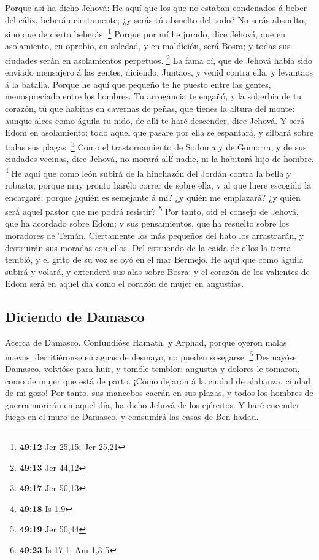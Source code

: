  Porque así ha dicho Jehová: He aquí que los que no
estaban condenados á beber del cáliz, beberán ciertamente; ¿y serás tú
absuelto del todo? No serás absuelto, sino que de cierto beberás.
\footnote{\textbf{49:12} Jer 25,15; Jer 25,21}  Porque
por mí he jurado, dice Jehová, que en asolamiento, en oprobio, en
soledad, y en maldición, será Bosra; y todas sus ciudades serán en
asolamientos perpetuos. \footnote{\textbf{49:13} Jer 44,12}
 La fama oí, que de Jehová había sido enviado mensajero á
las gentes, diciendo: Juntaos, y venid contra ella, y levantaos á la
batalla.  Porque he aquí que pequeño te he puesto entre
las gentes, menospreciado entre los hombres.  Tu
arrogancia te engañó, y la soberbia de tu corazón, tú que habitas en
cavernas de peñas, que tienes la altura del monte: aunque alces como
águila tu nido, de allí te haré descender, dice Jehová. 
Y será Edom en asolamiento: todo aquel que pasare por ella se espantará,
y silbará sobre todas sus plagas. \footnote{\textbf{49:17} Jer 50,13}
 Como el trastornamiento de Sodoma y de Gomorra, y de sus
ciudades vecinas, dice Jehová, no morará allí nadie, ni la habitará hijo
de hombre. \footnote{\textbf{49:18} Is 1,9}  He aquí que
como león subirá de la hinchazón del Jordán contra la bella y robusta;
porque muy pronto harélo correr de sobre ella, y al que fuere escogido
la encargaré; porque ¿quién es semejante á mí? ¿y quién me emplazará? ¿y
quién será aquel pastor que me podrá resistir? \footnote{\textbf{49:19}
  Jer 50,44}  Por tanto, oid el consejo de Jehová, que ha
acordado sobre Edom; y sus pensamientos, que ha resuelto sobre los
moradores de Temán. Ciertamente los más pequeños del hato los
arrastrarán, y destruirán sus moradas con ellos.  Del
estruendo de la caída de ellos la tierra tembló, y el grito de su voz se
oyó en el mar Bermejo.  He aquí que como águila subirá y
volará, y extenderá sus alas sobre Bosra: y el corazón de los valientes
de Edom será en aquel día como el corazón de mujer en angustias.

\hypertarget{diciendo-de-damasco}{%
\subsection{Diciendo de Damasco}\label{diciendo-de-damasco}}

 Acerca de Damasco. Confundióse Hamath, y Arphad, porque
oyeron malas nuevas: derritiéronse en aguas de desmayo, no pueden
sosegarse. \footnote{\textbf{49:23} Is 17,1; Am 1,3-5} 
Desmayóse Damasco, volvióse para huir, y tomóle temblor: angustia y
dolores le tomaron, como de mujer que está de parto. 
¡Cómo dejaron á la ciudad de alabanza, ciudad de mi gozo!
 Por tanto, sus mancebos caerán en sus plazas, y todos
los hombres de guerra morirán en aquel día, ha dicho Jehová de los
ejércitos.  Y haré encender fuego en el muro de Damasco,
y consumirá las casas de Ben-hadad.

